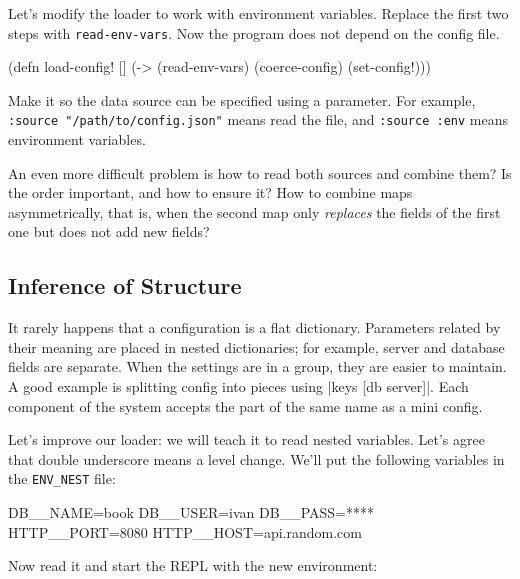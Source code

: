 Let's modify the loader to work with environment variables. Replace the first two steps with \verb|read-env-vars|. Now the program does not depend on the config file.

\begin{english}
  \begin{clojure}
(defn load-config! []
  (-> (read-env-vars)
      (coerce-config)
      (set-config!)))
  \end{clojure}
\end{english}

Make it so the data source can be specified using a parameter. For example, \verb|:source "/path/to/config.json"| means read the file, and \verb|:source :env| means environment variables.


An even more difficult problem is how to read both sources and combine them? Is
the order important, and how to ensure it? How to combine maps asymmetrically,
that is, when the second map only \emph{replaces} the fields of the first one
but does not add new fields?

\subsection{Inference of Structure}


It rarely happens that a configuration is a flat dictionary. Parameters related by their meaning are placed in nested dictionaries; for example, server and database fields are separate. When the settings are in a group, they are easier to maintain. A good example is splitting config into pieces using \spverb|{keys [db server]}|. Each component of the system accepts the part of the same name as a mini config.

Let's improve our loader: we will teach it to read nested variables. Let's agree that double underscore means a level change. We'll put the following variables
in the \verb|ENV_NEST| file:

\begin{english}
  \begin{bash}
DB__NAME=book
DB__USER=ivan
DB__PASS=****
HTTP__PORT=8080
HTTP__HOST=api.random.com
  \end{bash}
\end{english}


\noindent
Now read it and start the REPL with the new environment:


